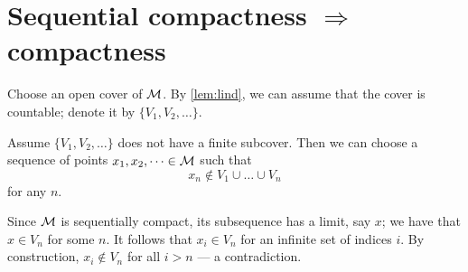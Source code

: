 \section[\texorpdfstring{Sequential compactness $\Rightarrow$  compactness}{Sequential compactness ⇒ compactness}]{Sequential compactness $\bm{\Rightarrow}$ compactness}\label{sec:seq-comp-if}

Choose an open cover of $\mathcal{M}$.
By \ref{lem:lind}, we can assume that the cover is countable;
denote it by $\{V_1,V_2,\dots\}$.

Assume $\{V_1,V_2,\dots\}$ does not have a finite subcover.
Then we can choose a sequence of points $x_1,x_2,\dots\in\mathcal{M}$ such that
\[x_n\notin  V_1\cup \dots\cup V_n\]
for any $n$.

Since $\mathcal{M}$ is sequentially compact, its subsequence has a limit, say $x$;
we have that $x\in V_n$ for some $n$.
It follows that $x_i\in V_n$ for an infinite set of indices $i$.
By construction, $x_i\notin V_n$ for all $i>n$ --- a contradiction.
\qeds
